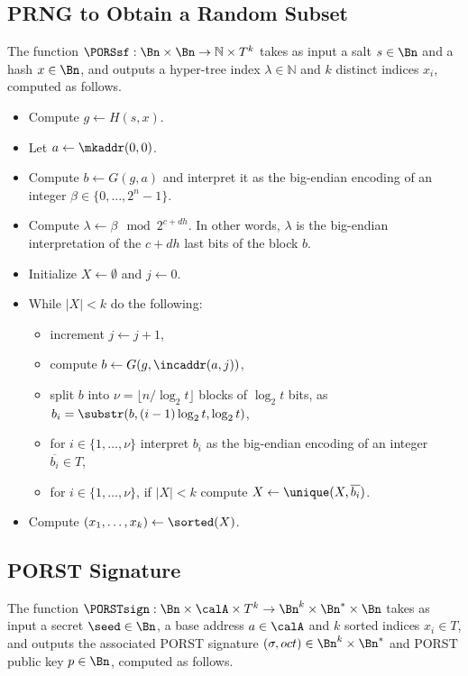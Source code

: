 \subsection{PRNG to Obtain a Random Subset}

The function $\PORSsf : \Bn \times \Bn \to \mathbb{N} \times T^k$ takes as input a salt $s \in \Bn$ and a hash $x \in \Bn$, and outputs a hyper-tree index $\lambda \in \mathbb{N}$ and $k$ distinct indices $x_i$, computed as follows.

\begin{itemize}
\item Compute $g \gets H(s, x)$.
\item Let $a \gets \mkaddr(0,0)$.
\item Compute $b \gets G(g, a)$ and interpret it as the big-endian encoding of an integer $\beta \in \{0, \ldots, 2^n-1\}$.
\item Compute $\lambda \gets \beta \mod 2^{c+dh}$. In other words, $\lambda$ is the big-endian interpretation of the $c+dh$ last bits of the block $b$.
\item Initialize $X \gets \emptyset$ and $j \gets 0$.
\item While $|X| < k$ do the following:
    \begin{itemize}
    \item increment $j \gets j+1$,
    \item compute $b \gets G(g, \incaddr(a,j))$,
    \item split $b$ into $\nu = \lfloor n / \log_2{t} \rfloor$ blocks of $\log_2{t}$ bits, as $b_i = \substr(b, (i-1)\log_2{t}, \log_2{t})$,
    \item for $i \in \{1, \ldots, \nu\}$ interpret $b_i$ as the big-endian encoding of an integer $\overline{b_i} \in T$,
    \item for $i \in \{1, \ldots, \nu\}$, if $|X| < k$ compute $X \gets \unique(X, \overline{b_i})$.
    \end{itemize}
\item Compute $(x_1, \ldots, x_k) \gets \sorted(X)$.
\end{itemize}

\subsection{PORST Signature}

The function $\PORSTsign : \Bn \times \calA \times T^k \to \Bn^k \times \Bn^* \times \Bn$ takes as input a secret $\seed \in \Bn$, a base address $a \in \calA$ and $k$ sorted indices $x_i \in T$, and outputs the associated PORST signature $(\sigma, oct) \in \Bn^k \times \Bn^*$ and PORST public key $p \in \Bn$, computed as follows.

